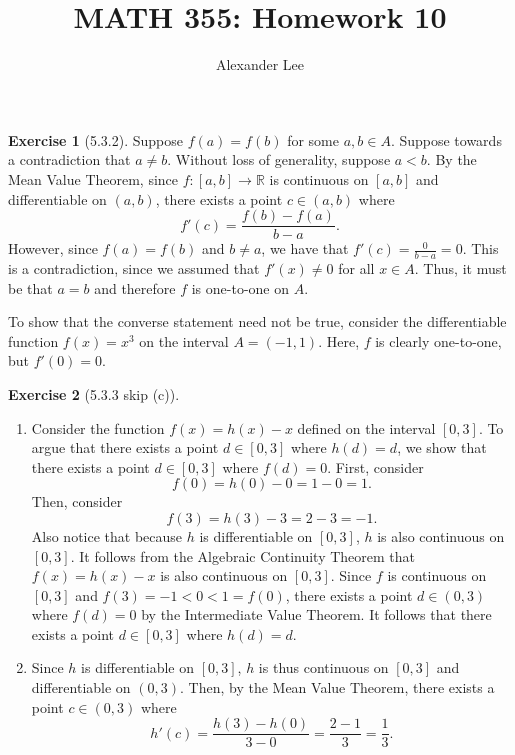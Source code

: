 \documentclass{amsart}
\title{MATH 355: Homework 10}
\author{Alexander Lee}
\theoremstyle{definition}
\newtheorem{exercise}{Exercise}
\newcommand{\R}{\mathbb{R}}
\begin{document}
\maketitle

\begin{exercise}[5.3.2]
  Suppose $f(a) = f(b)$ for some $a, b \in A$. Suppose towards a contradiction
  that $a \neq b$. Without loss of generality, suppose $a < b$. By the Mean
  Value Theorem, since $f : [a, b] \to \R$ is continuous on $[a, b]$ and
  differentiable on $(a, b)$, there exists a point $c \in (a, b)$ where
  \[
    f'(c) = \frac{f(b) - f(a)}{b - a}.
  \]
  However, since $f(a) = f(b)$ and $b \neq a$, we have that $f'(c) = \frac{0}{b
  - a} = 0$. This is a contradiction, since we assumed that $f'(x) \neq 0$ for
  all $x \in A$. Thus, it must be that $a = b$ and therefore $f$ is one-to-one
  on $A$.

  To show that the converse statement need not be true, consider the
  differentiable function $f(x) = x^3$ on the interval $A = (-1, 1)$. Here,
  $f$ is clearly one-to-one, but $f'(0) = 0$.
\end{exercise}

\begin{exercise}[5.3.3 skip (c)]
  \begin{enumerate}[label={(\alph*)}]
    \item Consider the function $f(x) = h(x) - x$ defined on the interval $[0,
      3]$. To argue that there exists a point $d \in [0, 3]$ where $h(d) = d$,
      we show that there exists a point $d \in [0, 3]$ where $f(d) = 0$. First,
      consider
      \[
        f(0) = h(0) - 0 = 1 - 0 = 1.
      \]
      Then, consider
      \[
        f(3) = h(3) - 3 = 2 - 3 = -1.
      \]
      Also notice that because $h$ is differentiable on $[0, 3]$, $h$ is also
      continuous on $[0, 3]$. It follows from the Algebraic Continuity Theorem
      that $f(x) = h(x) - x$ is also continuous on $[0, 3]$. Since $f$ is
      continuous on $[0, 3]$ and $f(3) = -1 < 0 < 1 = f(0)$, there exists a
      point $d \in (0, 3)$ where $f(d) = 0$ by the Intermediate Value Theorem.
      It follows that there exists a point $d \in [0, 3]$ where $h(d) = d$.
    \item Since $h$ is differentiable on $[0, 3]$, $h$ is thus continuous on
      $[0, 3]$ and differentiable on $(0, 3)$. Then, by the Mean Value Theorem,
      there exists a point $c \in (0, 3)$ where
      \[
        h'(c) = \frac{h(3) - h(0)}{3 - 0} = \frac{2 - 1}{3} = \frac{1}{3}.
      \]
  \end{enumerate}
\end{exercise}
\end{document}
